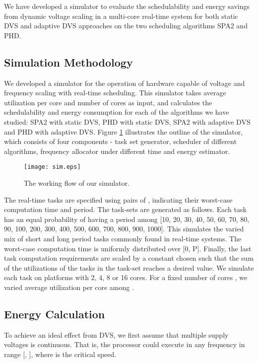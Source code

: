 \documentclass[12pt, journal,compsoc]{IEEEtran}
\begin{document}
We have developed a simulator to evaluate the schedulability and energy savings from dynamic voltage scaling in a multi-core real-time system for both static DVS and adaptive DVS approaches on the two scheduling algorithms SPA2 and PHD.

\subsection{Simulation Methodology}

We developed a simulator for the operation of hardware capable of voltage and frequency scaling with real-time scheduling. This simulator takes average utilization per core and number of cores as input, and calculates the schedulability and energy consumption for each of the algorithms we have studied: SPA2 with static DVS, PHD with static DVS, SPA2 with adaptive DVS and PHD with adaptive DVS. Figure \ref{so} illustrates the outline of the simulator, which consists of four components - task set generator, scheduler of different algorithms, frequency allocator under different time and energy estimator.

\begin{figure}[!t]
\centering
\texttt{[image: sim.eps]}
\caption{The working flow of our simulator.}
\label{so}
\end{figure}

The real-time tasks are specified using pairs of , indicating their worst-case computation time and period. The task-sets are generated as follows. Each task has an equal probability of having a period among [10, 20, 30, 40, 50, 60, 70, 80, 90, 100, 200, 300, 400, 500, 600, 700, 800, 900, 1000]. This simulates the varied mix of short and long period tasks commonly found in real-time systems. The worst-case computation time is uniformly distributed over [0, P]. Finally, the last task computation requirements are scaled by a constant chosen such that the sum of the utilizations of the tasks in the task-set reaches a desired value. We simulate each task on platforms with 2, 4, 8 or 16 cores. For a fixed number of cores , we varied average utilization per core among .

\subsection{Energy Calculation}

To achieve an ideal effect from DVS, we first assume that multiple supply voltages is continuous. That is, the processor could execute in any frequency in range [, ], where  is the critical speed.
\end{document}
